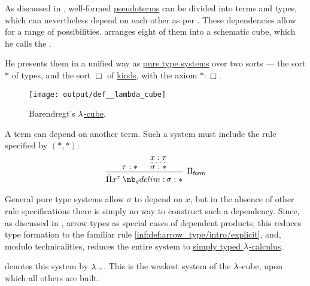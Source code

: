 \begin{definition}\label{def:lambda_cube}
   As discussed in , well-formed \hyperref[con:pseudoterm_expression]{pseudoterms} can be divided into terms and types, which can nevertheless depend on each other as per . These dependencies allow for a range of possibilities.  arranges eight of them into a schematic cube, which he calls the .

  He presents them in a unified way as \hyperref[def:pure_type_system]{pure type systems} over two sorts --- the sort \( \ast \) of types, and the sort \( \Box \) of \hyperref[con:type_universe]{kinds}, with the axiom \( \ast: \Box \).

  \begin{figure}[!ht]
    \centering
    \texttt{[image: output/def\_\_lambda\_cube]}
    \caption{Barendregt's \hyperref[def:lambda_cube]{\( {\mathrm \lambda} \)-cube}.}\label{fig:def:lambda_cube}
  \end{figure}

  \begin{thmenum}
     A term can depend on another term. Such a system must include the rule specified by \( (\ast, \ast) \):
    \begin{equation*}
      \begin{prooftree}
        \hypo{ \tau: \ast }

        \hypo{ x: \tau }
        \infer[dashed]1{ \sigma: \ast }

        \infer2[\ensuremath{ \Pi_{\logic{form}} }]{ \qprod {x^\tau} \sigma: \ast }
      \end{prooftree}
    \end{equation*}

    General pure type systems allow \( \sigma \) to depend on \( x \), but in the absence of other rule specifications there is simply no way to construct such a dependency. Since, as discussed in , arrow types as special cases of dependent products, this reduces type formation to the familiar rule \ref{inf:def:arrow_type/intro/explicit}, and, modulo technicalities, reduces the entire system to \hyperref[con:simple_type_theory/arrow]{simply typed \( {\mathrm \lambda} \)-calculus}.

     denotes this system by \( {\mathrm \lambda}_{\rightarrow} \). This is the weakest system of the \( {\mathrm \lambda} \)-cube, upon which all others are built.


\end{thmenum}
\end{definition}
